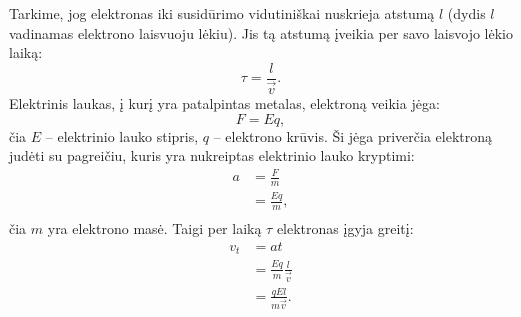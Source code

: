 Tarkime, jog elektronas iki susidūrimo vidutiniškai nuskrieja atstumą
$l$ (dydis $l$ vadinamas elektrono laisvuoju lėkiu). Jis tą
atstumą įveikia per savo laisvojo lėkio laiką:
\begin{equation*}
  \tau = \frac{l}{\vec{v}}.
\end{equation*}
Elektrinis laukas, į kurį yra patalpintas metalas, elektroną veikia
jėga:
\begin{equation*}
  F = Eq,
\end{equation*}
čia $E$ – elektrinio lauko stipris, $q$ – elektrono krūvis. Ši jėga
priverčia elektroną judėti su pagreičiu, kuris yra nukreiptas elektrinio
lauko kryptimi:
\begin{align*}
  a
  &= \frac{F}{m} \\
  &= \frac{Eq}{m}, \\
\end{align*}
čia $m$ yra elektrono masė. Taigi per laiką $\tau$ elektronas įgyja
greitį:
\begin{align*}
  v_{t}
  &= at \\
  &= \frac{Eq}{m} \frac{l}{\vec{v}} \\
  &= \frac{qEl}{m\vec{v}}. \\
\end{align*}

